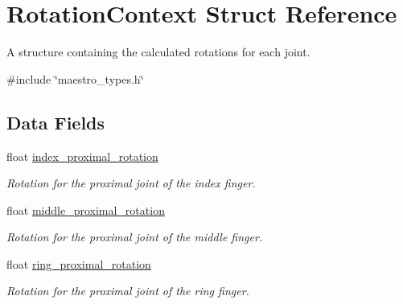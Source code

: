 \hypertarget{struct_rotation_context}{}\section{Rotation\+Context Struct Reference}
\label{struct_rotation_context}


A structure containing the calculated rotations for each joint.  




{\ttfamily \#include \char`\"{}maestro\+\_\+types.\+h\char`\"{}}

\subsection*{Data Fields}
\begin{DoxyCompactItemize}
\item 
\mbox{\label{struct_rotation_context_a81b612bd6d1aa2c5b06098761225f82b}} 
float \hyperlink{struct_rotation_context_a81b612bd6d1aa2c5b06098761225f82b}{index\+\_\+proximal\+\_\+rotation}
\begin{DoxyCompactList}\small\item\em Rotation for the proximal joint of the index finger. \end{DoxyCompactList}\item 
\mbox{\label{struct_rotation_context_ad66ce02bfed77b041d5848f74589760c}} 
float \hyperlink{struct_rotation_context_ad66ce02bfed77b041d5848f74589760c}{middle\+\_\+proximal\+\_\+rotation}
\begin{DoxyCompactList}\small\item\em Rotation for the proximal joint of the middle finger. \end{DoxyCompactList}\item 
\mbox{\label{struct_rotation_context_a620e9eb808b01379fe03aca093b5033b}} 
float \hyperlink{struct_rotation_context_a620e9eb808b01379fe03aca093b5033b}{ring\+\_\+proximal\+\_\+rotation}
\begin{DoxyCompactList}\small\item\em Rotation for the proximal joint of the ring finger. \end{DoxyCompactList}\item 
\mbox{\label{struct_rotation_context_a869372b9af3b26e0239a12d4e6329ed3}} 

\end{DoxyCompactItemize}
